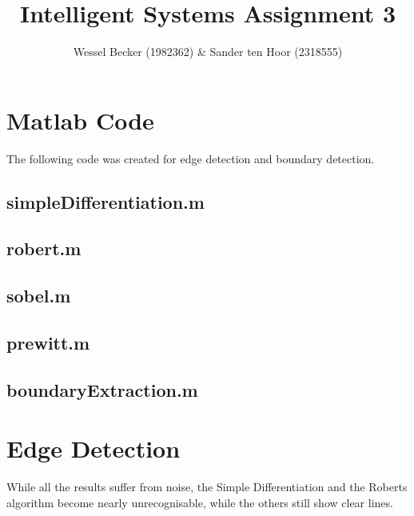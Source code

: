 \documentclass[10pt,a4paper]{article}
\begin{document}
\title{Intelligent Systems Assignment 3}
\author{Wessel Becker (1982362) \& Sander ten Hoor (2318555)}
\maketitle

\section{Matlab Code}
The following code was created for edge detection and boundary detection.

\subsection{simpleDifferentiation.m}


\subsection{robert.m}


\subsection{sobel.m}


\subsection{prewitt.m}


%

\subsection{boundaryExtraction.m}


\section{Edge Detection}
While all the results suffer from noise, the Simple Differentiation and the Roberts algorithm become nearly unrecognisable, while the others still show clear lines.
\end{document}
